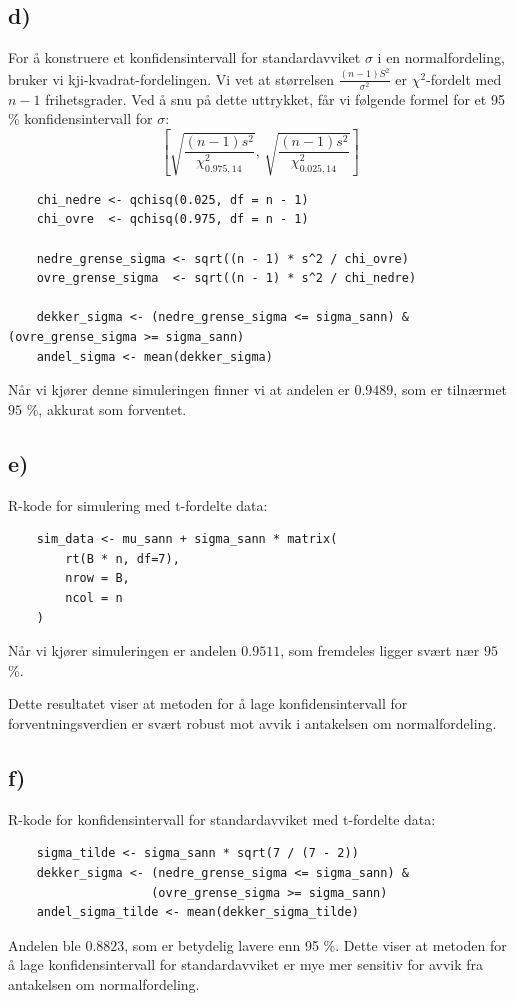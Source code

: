 \documentclass[11pt, a4paper]{article}
\begin{document}
\subsection*{d)}
For å konstruere et konfidensintervall for standardavviket $\sigma$ i en normalfordeling, bruker vi kji-kvadrat-fordelingen. Vi vet at størrelsen $\frac{(n-1)S^2}{\sigma^2}$ er $\chi^2$-fordelt med $n-1$ frihetsgrader. Ved å snu på dette uttrykket, får vi følgende formel for et 95 \% konfidensintervall for $\sigma$:
\begin{equation*}
    \left[ \sqrt{\frac{(n-1)s^2}{\chi^2_{0.975, 14}}}, \, \sqrt{\frac{(n-1)s^2}{\chi^2_{0.025, 14}}} \right]
\end{equation*}

\begin{verbatim}
    chi_nedre <- qchisq(0.025, df = n - 1)
    chi_ovre  <- qchisq(0.975, df = n - 1)

    nedre_grense_sigma <- sqrt((n - 1) * s^2 / chi_ovre)
    ovre_grense_sigma  <- sqrt((n - 1) * s^2 / chi_nedre)

    dekker_sigma <- (nedre_grense_sigma <= sigma_sann) & (ovre_grense_sigma >= sigma_sann)
    andel_sigma <- mean(dekker_sigma)
\end{verbatim}

Når vi kjører denne simuleringen finner vi at andelen er $0.9489$, som er tilnærmet $95$ \%, akkurat som forventet.

\subsection*{e)}
R-kode for simulering med t-fordelte data: 
\begin{verbatim}
    sim_data <- mu_sann + sigma_sann * matrix(
        rt(B * n, df=7), 
        nrow = B, 
        ncol = n
    )
\end{verbatim}

Når vi kjører simuleringen er andelen $0.9511$, som fremdeles ligger svært nær $95$ \%. 

Dette resultatet viser at metoden for å lage konfidensintervall for forventningsverdien er svært robust mot avvik i antakelsen om normalfordeling.

\subsection*{f)}
R-kode for konfidensintervall for standardavviket med t-fordelte data: 
\begin{verbatim}
    sigma_tilde <- sigma_sann * sqrt(7 / (7 - 2))
    dekker_sigma <- (nedre_grense_sigma <= sigma_sann) & 
                    (ovre_grense_sigma >= sigma_sann)
    andel_sigma_tilde <- mean(dekker_sigma_tilde)
\end{verbatim}

Andelen ble $0.8823$, som er betydelig lavere enn 95 \%. Dette viser at metoden for å lage konfidensintervall for standardavviket er mye mer sensitiv for avvik fra antakelsen om normalfordeling.
\end{document}
